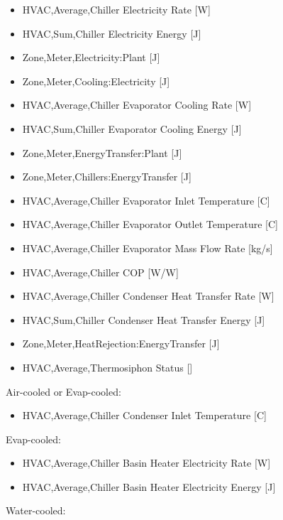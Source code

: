 \begin{itemize}
    \item
    HVAC,Average,Chiller Electricity Rate {[}W{]}
    \item
    HVAC,Sum,Chiller Electricity Energy {[}J{]}
    \item
    Zone,Meter,Electricity:Plant {[}J{]}
    \item
    Zone,Meter,Cooling:Electricity {[}J{]}
    \item
    HVAC,Average,Chiller Evaporator Cooling Rate {[}W{]}
    \item
    HVAC,Sum,Chiller Evaporator Cooling Energy {[}J{]}
    \item
    Zone,Meter,EnergyTransfer:Plant {[}J{]}
    \item
    Zone,Meter,Chillers:EnergyTransfer {[}J{]}
    \item
    HVAC,Average,Chiller Evaporator Inlet Temperature {[}C{]}
    \item
    HVAC,Average,Chiller Evaporator Outlet Temperature {[}C{]}
    \item
    HVAC,Average,Chiller Evaporator Mass Flow Rate {[}kg/s{]}
    \item
    HVAC,Average,Chiller COP {[}W/W{]}
    \item
    HVAC,Average,Chiller Condenser Heat Transfer Rate {[}W{]}
    \item
    HVAC,Sum,Chiller Condenser Heat Transfer Energy {[}J{]}
    \item
    Zone,Meter,HeatRejection:EnergyTransfer {[}J{]}
    \item
    HVAC,Average,Thermosiphon Status {[]}
\end{itemize}

Air-cooled or Evap-cooled:

\begin{itemize}
    \tightlist
    \item
    HVAC,Average,Chiller Condenser Inlet Temperature {[}C{]}
\end{itemize}

Evap-cooled:

\begin{itemize}
    \item
    HVAC,Average,Chiller Basin Heater Electricity Rate {[}W{]}
    \item
    HVAC,Average,Chiller Basin Heater Electricity Energy {[}J{]}
\end{itemize}

Water-cooled:

